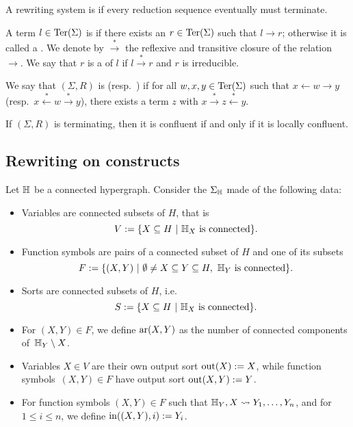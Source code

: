 A rewriting system is  if every reduction sequence eventually must terminate.

A term $l \in \operatorname{Ter}(\Sigma)$ is  if there exists an $r \in \operatorname{Ter}(\Sigma)$ such that $l \to r$; otherwise it is called a .
We denote by $\overset{*}{\to}$ the reflexive and transitive closure of the relation~$\to$.
We say that $r$ is a  of $l$ if $l \overset{*}{\to} r$ and $r$ is irreducible.

We say that $(\Sigma,R)$ is  (resp.\ ) if for all $w,x,y \in \operatorname{Ter}(\Sigma)$ such that $x \leftarrow w \to y$ (resp.\ $x \overset{*}{\leftarrow} w \overset{*}{\to} y$), there exists a term $z$ with $x \overset{*}{\to} z \overset{*}{\leftarrow} y$.

\begin{thm}
  \label{thm:Newman}
  If $(\Sigma,R)$ is terminating, then it is confluent if and only if it is locally confluent.
\end{thm}


\subsection{Rewriting on constructs}

\begin{definition} \label{def:signature-hyper}
  Let ${\mathbb H}$ be a connected hypergraph. 
Consider the  $\Sigma_{\mathbb H}$ made of the following data: 
\begin{itemize}
  \item Variables are connected subsets of $H$, that is $$V:=\{ X \subseteq H \ | \ \hyper{H}_{X} \text{ is connected}\}.$$ 
  \item Function symbols are pairs of a connected subset of $H$ and one of its subsets 
  $$F:=\{(X,Y) \ | \ \emptyset \neq X \subseteq Y \subseteq H, \ \hyper{H}_Y \text{ is connected}\}.$$
  \item Sorts are connected subsets of $H$, i.e. 
  $$S:=\{ X \subseteq H \ | \ {\mathbb H}_X \text{ is connected}\}.$$
  \item For $(X,Y) \in F$, we define $\mathrm{ar}(X,Y)$ as the number of connected components of~${\mathbb H}_Y\setminus X$.
  \item Variables $X \in V$ are their own output sort $\operatorname{out}(X):=X$, while function symbols~$(X,Y) \in F$ have output sort $\operatorname{out}(X,Y):=Y$.
  \item For function symbols $(X,Y) \in F$ such that ${\mathbb H}_Y,X \leadsto Y_1,\ldots,Y_n$, and for $1 \leq i \leq n$, we define $\operatorname{in}((X,Y),i):=Y_i$.
\end{itemize}
\end{definition}

